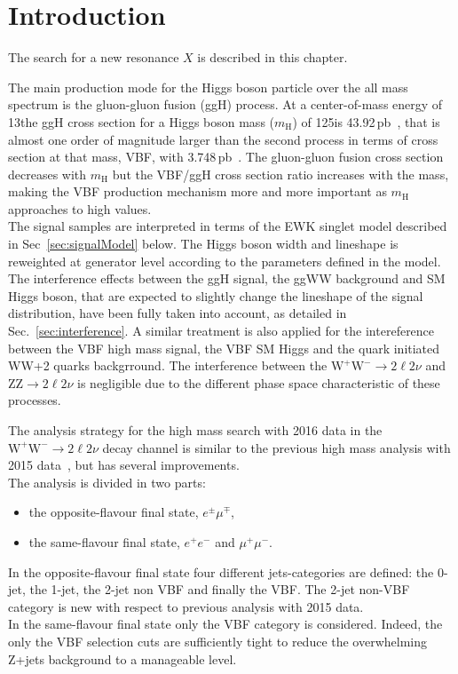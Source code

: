 
\section{Introduction}\label{sec:AnalysisStrategy_Intro}
The search for a new resonance $X$ is described in this chapter.

The main production mode for the Higgs boson particle over the all mass spectrum is the gluon-gluon fusion (ggH) process. At a center-of-mass energy of 13\TeV the ggH cross section for a Higgs boson mass ($m_\mathrm{H}$) of 125\GeV is 43.92\,pb~\cite{temphiggsxsecs}, that is almost one order of magnitude larger than the second process  in terms of cross section at that mass, VBF, with 3.748\,pb~\cite{temphiggsxsecs}. The  gluon-gluon fusion cross section decreases with $m_\mathrm{H}$ but the VBF/ggH cross section ratio increases with the mass, making the VBF production mechanism more and more important as $m_\mathrm{H}$ approaches to high values.\\
The signal samples are interpreted in terms of the EWK singlet model described in Sec~\ref{sec:signalModel} below. 
The Higgs boson width and lineshape is reweighted at generator level according to the parameters defined in the model.
The interference effects between the ggH signal, the ggWW background and SM
Higgs boson, that are expected to slightly change the lineshape of the signal
distribution, have been fully taken into account, as detailed in
Sec.~\ref{sec:interference}. A similar treatment is also applied for the
intereference between the VBF high mass signal, the VBF SM Higgs and the quark
initiated WW+2 quarks backgrround. The interference between the $\mathrm{W^+W^-}\to2\ell2\nu$ and $\mathrm{ZZ}\to2\ell2\nu$ is negligible due to the different phase space characteristic of these processes. 


The analysis strategy for the high mass search with 2016 data in the
$\mathrm{W^+W^-}\to2\ell2\nu$ decay channel  is similar to the previous high
mass analysis with 2015 data~\cite{CMS-PAS-HIG-16-023}, but has several improvements. \\
The analysis is divided in two parts: 
\begin{itemize}
\item the opposite-flavour final state, $e^{\pm} \mu^{\mp}$,
\item the  same-flavour final state, $e^+ e^-$ and  $\mu^+ \mu^-$. 
\end{itemize}
In the opposite-flavour final state four different jets-categories are defined: the 
0-jet, the 1-jet, the 2-jet non VBF and finally the VBF. The 2-jet non-VBF category is new with respect to previous analysis with 2015 data.\\
In the same-flavour final state only the VBF category is considered. Indeed, the only the VBF selection cuts are sufficiently tight to reduce the  overwhelming Z+jets background to a manageable level.




